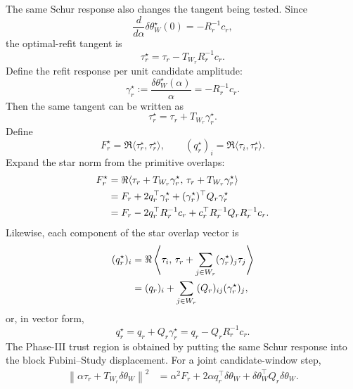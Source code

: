 \documentclass[10pt,twocolumn]{article}
\begin{document}
The same Schur response also changes the tangent being tested. Since
\begin{equation}
\frac{d}{d\alpha}\delta\theta_W^\star(0)=-R_r^{-1}c_r,
\label{eq:p1_window_response}
\end{equation}
the optimal-refit tangent is
\begin{equation}
\tau_r^\star=\tau_r-T_{W_r}R_r^{-1}c_r.
\label{eq:p1_tau_star}
\end{equation}
Define the refit response per unit candidate amplitude:
\begin{equation}
\gamma_r^\star
:=\frac{\delta\theta_W^\star(\alpha)}{\alpha}
=-R_r^{-1}c_r.
\label{eq:p1_gamma_star}
\end{equation}
Then the same tangent can be written as
\begin{equation}
\tau_r^\star=\tau_r+T_{W_r}\gamma_r^\star.
\label{eq:p1_tau_star_gamma}
\end{equation}
Define
\begin{equation}
F_r^\star=\Re\langle\tau_r^\star,\tau_r^\star\rangle,
\qquad
(q_r^\star)_i=\Re\langle\tau_i,\tau_r^\star\rangle.
\label{eq:p1_star_primitives}
\end{equation}
Expand the star norm from the primitive overlaps:
\begin{align}
F_r^\star
&=\Re\langle \tau_r+T_{W_r}\gamma_r^\star,\,
\tau_r+T_{W_r}\gamma_r^\star\rangle
\notag\\
&=F_r+2q_r^\top\gamma_r^\star
+(\gamma_r^\star)^\top Q_r\gamma_r^\star
\notag\\
&=
F_r-2q_r^\top R_r^{-1}c_r
+c_r^\top R_r^{-1}Q_rR_r^{-1}c_r .
\label{eq:p1_F_star_expand}
\end{align}
Likewise, each component of the star overlap vector is
\begin{align}
(q_r^\star)_i
&=\Re\left\langle
\tau_i,\,
\tau_r+\sum_{j\in W_r}(\gamma_r^\star)_j\tau_j
\right\rangle
\notag\\
&=(q_r)_i+\sum_{j\in W_r}(Q_r)_{ij}(\gamma_r^\star)_j,
\label{eq:p1_q_star_components}
\end{align}
or, in vector form,
\begin{equation}
q_r^\star=q_r+Q_r\gamma_r^\star
=q_r-Q_rR_r^{-1}c_r.
\label{eq:p1_q_star_expand}
\end{equation}
The Phase-III trust region is obtained by putting the same Schur response into the block Fubini--Study displacement. For a joint candidate-window step,
\begin{align}
\left\|\alpha\tau_r+T_{W_r}\delta\theta_W\right\|^2
&=
\alpha^2F_r
+2\alpha q_r^\top\delta\theta_W
+\delta\theta_W^\top Q_r\delta\theta_W .
\label{eq:p1_phase3_block_fs}
\end{align}
\end{document}
